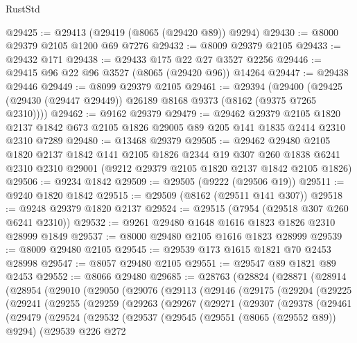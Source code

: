 \begin{lexlean}{RustStd}
\begin{coremodule}
@29425 := @29413 (@29419 (@8065 (@29420 @89)) @9294)
@29430 := @8000 @29379 @2105 @1200 @69 @7276
@29432 := @8009 @29379 @2105
@29433 := @29432 @171
@29438 := @29433 @175 @22 @27 @3527 @2256
@29446 := @29415 @96 @22 @96 @3527 (@8065 (@29420 @96)) @14264
@29447 := @29438 @29446
@29449 := @8099 @29379 @2105
@29461 := @29394
    (@29400 (@29425 (@29430 (@29447 @29449)) @26189 @8168 @9373 (@8162 (@9375 @7265 @2310))))
@29462 := @9162 @29379
@29479 := @29462
    @29379
    @2105
    @1820
    @2137
    @1842
    @673
    @2105
    @1826
    @29005
    @89
    @205
    @141
    @1835
    @2414
    @2310
    @2310
    @7289
@29480 := @13468 @29379
@29505 := @29462
    @29480
    @2105
    @1820
    @2137
    @1842
    @141
    @2105
    @1826
    @2344
    @19
    @307
    @260
    @1838
    @6241
    @2310
    @2310
    @29001
    (@9212 @29379 @2105 @1820 @2137 @1842 @2105 @1826)
@29506 := @9234 @1842
@29509 := @29505 (@9222 (@29506 @19))
@29511 := @9240 @1820 @1842
@29515 := @29509 (@8162 (@29511 @141 @307))
@29518 := @9248 @29379 @1820 @2137
@29524 := @29515 (@7954 (@29518 @307 @260 @6241 @2310))
@29532 := @9261 @29480 @1648 @1616 @1823 @1826 @2310 @28999 @1849
@29537 := @8000 @29480 @2105 @1616 @1823 @28999
@29539 := @8009 @29480 @2105
@29545 := @29539 @173 @1615 @1821 @70 @2453 @28998
@29547 := @8057 @29480 @2105
@29551 := @29547 @89 @1821 @89 @2453
@29552 := @8066 @29480
@29685 := @28763
    (@28824
      (@28871
        (@28914
          (@28954
            (@29010
              (@29050
                (@29076
                  (@29113
                    (@29146
                      (@29175
                        (@29204
                          (@29225
                            (@29241
                              (@29255
                                (@29259
                                  (@29263
                                    (@29267
                                      (@29271
                                        (@29307
                                          (@29378
                                            (@29461
                                              (@29479
                                                (@29524
                                                  (@29532
                                                    (@29537
                                                      (@29545
                                                        (@29551 (@8065 (@29552 @89)) @9294)
                                                        (@29539
                                                          @226
                                                          @272

\end{coremodule}
\end{lexlean}
